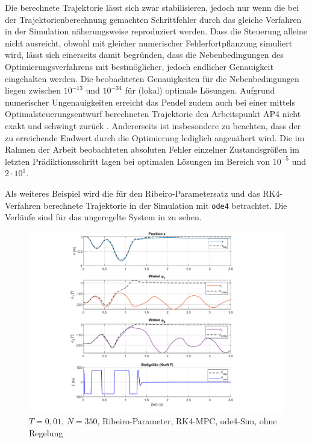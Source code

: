 Die berechnete Trajektorie lässt sich zwar stabilisieren, jedoch nur wenn die bei der Trajektorienberechnung gemachten Schrittfehler durch das gleiche Verfahren in der Simulation näherungsweise reproduziert werden. Dass die Steuerung alleine nicht ausreicht, obwohl mit gleicher numerischer Fehlerfortpflanzung simuliert wird, lässt sich einerseits damit begründen, dass die Nebenbedingungen des Optimierungsverfahrens mit bestmöglicher, jedoch endlicher Genauigkeit eingehalten werden. Die beobachteten Genauigkeiten für die Nebenbedingungen liegen zwischen $10^{-13}$ und $10^{-34}$ für (lokal) optimale Lösungen. Aufgrund numerischer Ungenauigkeiten erreicht das Pendel zudem auch bei einer mittels Optimalsteuerungsentwurf berechneten Trajektorie den Arbeitspunkt AP4 nicht exakt und schwingt zurück \cite{matPrakt2}. Andererseits ist insbesondere zu beachten, dass der zu erreichende Endwert durch die Optimierung lediglich angenähert wird. Die im Rahmen der Arbeit beobachteten absoluten Fehler einzelner Zustandsgrößen im letzten Prädiktionsschritt lagen bei optimalen Lösungen im Bereich von $10^{-5}$ und $2 \cdot 10^{1}$. 

Als weiteres Beispiel wird die für den Ribeiro-Parametersatz und das RK4-Verfahren berechnete Trajektorie in der Simulation mit \texttt{ode4} betrachtet. Die Verläufe sind für das ungeregelte System in  zu sehen. 
\begin{figure}[h]
	\centering
		\includegraphics[scale=\scaleyplots]{Bilder/Trajektorien/F400T0.01_rib_rk4_ode4.pdf}
	\caption{$T=0,01$, $N=350$, Ribeiro-Parameter, RK4-MPC, ode4-Sim, ohne Regelung}
	\label{fig:F400T0.01_rib_rk4_ode4}
\end{figure}

